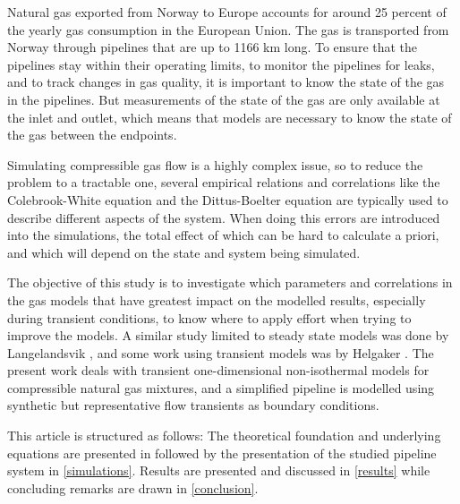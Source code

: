 Natural gas exported from Norway to Europe accounts for around 25 percent of the yearly gas consumption in the European Union. The gas is transported from Norway through pipelines that are up to 1166 km long. %
To ensure that the pipelines stay within their operating limits, to monitor the pipelines for leaks, and to track changes in gas quality, %
it is important to know the state of the gas in the pipelines. %
But measurements of the state of the gas are only available at the inlet and outlet, which means that  models are necessary to know the state of the gas between the endpoints. 

Simulating compressible gas flow is a highly complex issue, so to reduce the problem to a tractable one, several empirical relations and correlations like the Colebrook-White equation and the Dittus-Boelter equation are typically used to describe different aspects of the system. When doing this errors are introduced into the simulations, the total effect of which can be hard to calculate a priori, and which will depend on the state and system being simulated. 

The objective of this study is to investigate which parameters and correlations in the gas models that have greatest impact on the modelled results, especially during transient conditions, to know where to apply effort when trying to improve the models. A similar study limited to steady state models was done by Langelandsvik \cite{Langelandsvik2008Modeling}, and some work using transient models was by Helgaker \cite{Helgaker2013Modeling}. The present work deals with transient one-dimensional non-isothermal models for compressible natural gas mixtures, and a simplified pipeline is modelled using synthetic but representative flow transients as boundary conditions.

This article is structured as follows: The theoretical foundation and underlying equations are presented in 
followed by the presentation of the studied pipeline system in \cref{simulations}. Results are presented and discussed in \cref{results} while concluding remarks are drawn in \cref{conclusion}.